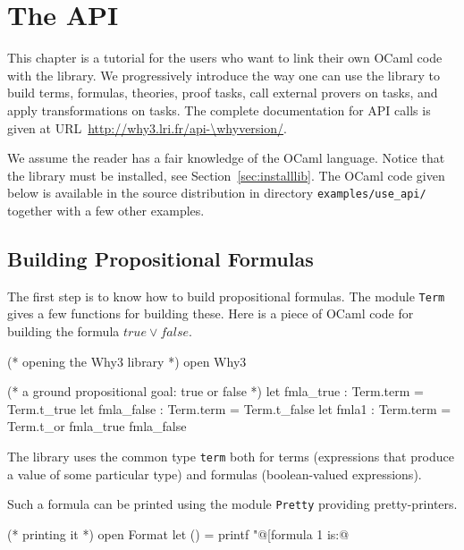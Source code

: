 \chapter{The \why API}
\label{chap:api}

This chapter is a tutorial for the users who want to link their own
OCaml code with the \why library. We progressively introduce the way
one can use the library to build terms, formulas, theories, proof
tasks, call external provers on tasks, and apply transformations on
tasks. The complete documentation for API calls is given
at URL~\url{http://why3.lri.fr/api-\whyversion/}.

We assume the reader has a fair knowledge of the OCaml
language. Notice that the \why library must be installed, see
Section~\ref{sec:installlib}. The OCaml code given below is available in
the source distribution in directory \verb|examples/use_api/| together
with a few other examples.


\section{Building Propositional Formulas}

The first step is to know how to build propositional formulas. The
module \texttt{Term} gives a few functions for building these. Here is
a piece of OCaml code for building the formula $\mathit{true} \lor
\mathit{false}$.
\begin{ocamlcode}
(* opening the Why3 library *)
open Why3

(* a ground propositional goal: true or false *)
let fmla_true : Term.term = Term.t_true
let fmla_false : Term.term = Term.t_false
let fmla1 : Term.term = Term.t_or fmla_true fmla_false
\end{ocamlcode}
The library uses the common type \texttt{term} both for terms
(\ie expressions that produce a value of some particular type)
and formulas (\ie boolean-valued expressions).

Such a formula can be printed using the module \texttt{Pretty}
providing pretty-printers.
\begin{ocamlcode}
(* printing it *)
open Format
let () = printf "@[formula 1 is:@ %
\end{ocamlcode}


